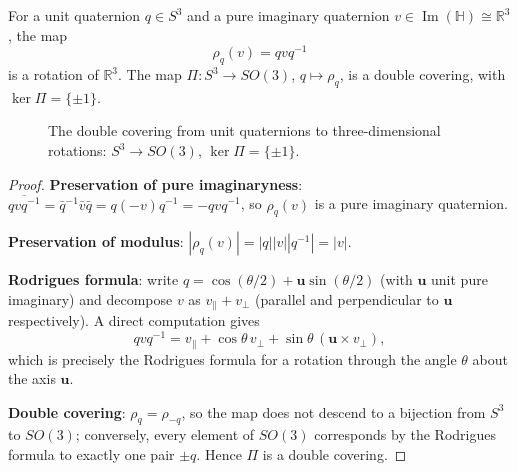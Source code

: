 \begin{theorem}\label{thm:quaternion_rotation_conjugation}
For a unit quaternion $q \in S^3$ and a pure imaginary quaternion $v \in \operatorname{Im}(\mathbb{H}) \cong \mathbb{R}^3$, the map
\[
\rho_q(v) = q v q^{-1}
\]
is a rotation of $\mathbb{R}^3$. The map $\Pi: S^3 \to SO(3)$, $q \mapsto \rho_q$, is a double covering, with $\ker \Pi = \{\pm 1\}$.
\end{theorem}

\begin{figure}[htbp]
\centering
{}
\caption{The double covering from unit quaternions to three-dimensional rotations: $S^3\to SO(3)$, $\ker\Pi=\{\pm1\}$.}
\label{fig:quaternion_cover}
\end{figure}

\begin{proof}
\textbf{Preservation of pure imaginaryness}: $\overline{qvq^{-1}} = \bar q^{-1} \bar v \bar q = q(-v)q^{-1} = -qvq^{-1}$, so $\rho_q(v)$ is a pure imaginary quaternion.

\textbf{Preservation of modulus}: $|\rho_q(v)| = |q||v||q^{-1}| = |v|$.

\textbf{Rodrigues formula}: write $q = \cos(\theta/2) + \mathbf{u}\sin(\theta/2)$ (with $\mathbf{u}$ unit pure imaginary) and decompose $v$ as $v_\parallel + v_\perp$ (parallel and perpendicular to $\mathbf{u}$ respectively). A direct computation gives
\[
qvq^{-1} = v_\parallel + \cos\theta\,v_\perp + \sin\theta\,(\mathbf{u}\times v_\perp),
\]
which is precisely the Rodrigues formula for a rotation through the angle $\theta$ about the axis $\mathbf{u}$.

\textbf{Double covering}: $\rho_q = \rho_{-q}$, so the map does not descend to a bijection from $S^3$ to $SO(3)$; conversely, every element of $SO(3)$ corresponds by the Rodrigues formula to exactly one pair $\pm q$. Hence $\Pi$ is a double covering.
\end{proof}

